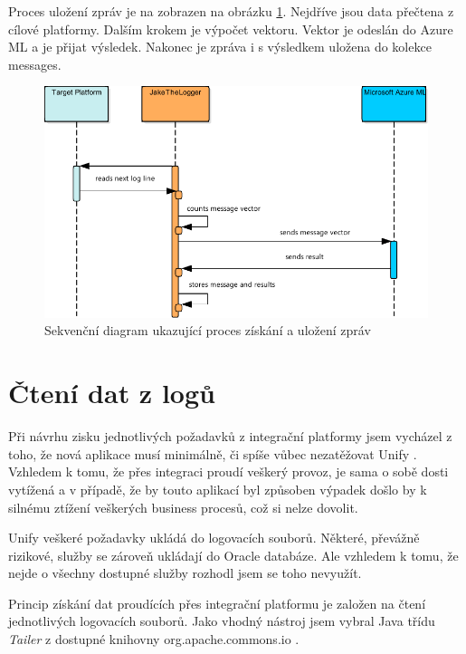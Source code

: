 \documentclass[thesis=M,czech]{FITthesis}[2012/10/20]
\newcommand{\tmpframe}[1]{\fbox{#1}}
\renewcommand{\tmpframe}[1]{#1}
\begin{document}
			Proces uložení zpráv je na zobrazen na obrázku \ref{fig:dataStoring-seq}. Nejdříve jsou data přečtena z cílové platformy. Dalším krokem je výpočet vektoru. Vektor je odeslán do Azure ML a je přijat výsledek. Nakonec je zpráva i s výsledkem uložena do kolekce messages.

			\begin{figure}[htb]\centering
				\tmpframe{\includegraphics[width=\textwidth]{./img/messagesStoring}}	
				\caption{Sekvenční diagram ukazující proces získání a uložení zpráv}
				\label{fig:dataStoring-seq}
			\end{figure}
	
				
	\section{Čtení dat z logů}				
		Při návrhu zisku jednotlivých požadavků z integrační platformy jsem vycházel z toho, že nová aplikace musí minimálně, či spíše vůbec nezatěžovat Unify \cite{unify}. Vzhledem k tomu, že přes integraci proudí veškerý provoz, je sama o sobě dosti vytížená a v případě, že by touto aplikací byl způsoben výpadek došlo by k silnému ztížení veškerých business procesů, což si nelze dovolit.
		
		Unify veškeré požadavky ukládá do logovacích souborů. Některé, převážně rizikové, služby se zároveň ukládají do Oracle databáze. Ale vzhledem k tomu, že nejde o všechny dostupné služby rozhodl jsem se toho nevyužít.
		
		Princip získání dat proudících přes integrační platformu je založen na čtení jednotlivých logovacích souborů. Jako vhodný nástroj jsem vybral Java třídu \textit{Tailer} z dostupné knihovny org.apache.commons.io \cite{tailerClass}.
		
\end{document}
